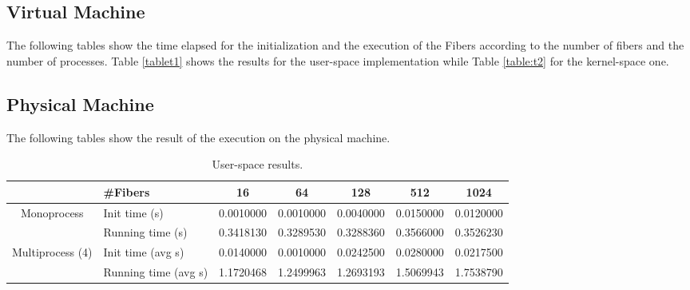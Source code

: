 \documentclass[11pt]{article}
\begin{document}
\newpage

\subsection{Virtual Machine}
The following tables show the time elapsed for the initialization and the execution of the Fibers according to the number of fibers and the number of processes. Table \ref{tablet1} shows the results for the user-space implementation while Table \ref{table:t2} for the kernel-space one.

\newpage


\subsection{Physical Machine}
The following tables show the result of the execution on the physical machine.

\begin{center}
\begin{table}[H]
\begin{tabular}{|c|l|c|c|c|c|c|}
\hline
\multicolumn{1}{|l|}{}            & \#Fibers             & 16        & 64        & 128       & 512       & 1024      \\ \hline
\multirow{2}{*}{Monoprocess}      & Init time (s)        & 0.0010000 & 0.0010000 & 0.0040000 & 0.0150000 & 0.0120000 \\ \cline{2-7} 
                                  & Running time (s)     & 0.3418130 & 0.3289530 & 0.3288360 & 0.3566000 & 0.3526230 \\ \hline
\multirow{2}{*}{Multiprocess (4)} & Init time (avg s)    & 0.0140000 & 0.0010000 & 0.0242500 & 0.0280000 & 0.0217500 \\ \cline{2-7} 
                                  & Running time (avg s) & 1.1720468 & 1.2499963 & 1.2693193 & 1.5069943 & 1.7538790 \\ \hline
\end{tabular}
\caption{User-space results.}
\label{table:t3}
\end{table}
\end{center}
\end{document}
